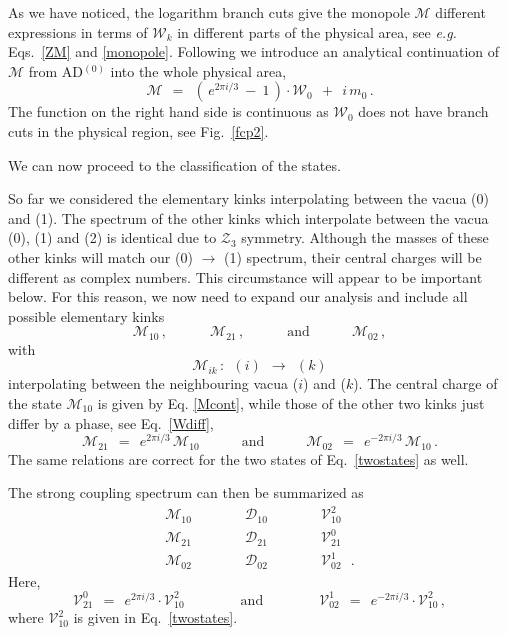 \documentclass[epsfig,12pt]{article}
\def\beq{\begin{equation}}
\def\eeq{\end{equation}}
\def\beq{\begin{equation}}
\def\eeq{\end{equation}}
\newcommand{\mc}[1]{\mathcal{#1}}
\newcommand{\W}{\mathcal{W}}
\newcommand{\M}{\mathcal{M}}
\newcommand{\D}{\mathcal{D}}
\newcommand{\V}{\mathcal{V}}
\begin{document}
	As we have noticed, the logarithm branch cuts give the monopole $ \M $ different expressions in terms
	of $ \W_k $ in different parts of the physical area, see {\it e.g.} Eqs.~\eqref{ZM} and \eqref{monopole}.
	Following \cite{Bolokhov:2011mp} we introduce an analytical continuation of $ \M $ from AD$^{(0)}$ into
	the whole physical area,
\beq
\label{Mcont}
	\M  ~~=~~  \left(\, e^{2 \pi i / 3} ~-~ 1 \,\right) \cdot \W_0  ~~+~~  i\, m_0\,.
\eeq
	The function on the right hand side is continuous as $ \W_0 $ does not have branch cuts in the physical 
	region, see Fig.~\ref{fcp2}.

	We can now proceed to the classification of the states.
	
	So far we considered the elementary kinks interpolating between
	the vacua ({\sc \small 0}) and ({\sc \small 1}).
	The spectrum of the other kinks which interpolate between the vacua ({\sc \small 0}), ({\sc \small 1}) and ({\sc \small 2})
	is identical due to $ \mc{Z}_3 $ symmetry.
	Although the masses of these other kinks will match our ({\sc \small 0}) $ \rightarrow $ ({\sc \small 1}) spectrum, 
	their central charges will be different as complex numbers.
	This circumstance will appear to be important below.
	For this reason, we now need to expand our analysis and include all possible elementary kinks
\beq
	\M_{10}\,,   \qquad\quad     \M_{21}\,,     \qquad\quad\text{and}\qquad\quad   \M_{02}\,,
\eeq
	with
\beq
	\M_{ik} \,:  ~~  ({ \scriptstyle i }) ~~\longrightarrow~~ ({ \scriptstyle k })
\eeq
	interpolating between the neighbouring vacua ($ \scriptstyle i $) and ($ \scriptstyle k $).
	The central charge of the state $ \M_{10} $ is given by Eq. \eqref{Mcont}, while those
	of the other two kinks just differ by a phase, see Eq.~\eqref{Wdiff},
\beq
	\M_{21} ~~=~~ e^{2 \pi i / 3}\, \M_{10}  
	\qquad\quad \text{and} \qquad\quad 
	\M_{02} ~~=~~ e^{- 2 \pi i / 3}\, \M_{10}\,.
\eeq
	The same relations are correct for the two states of Eq.~\eqref{twostates} as well.

	The strong coupling spectrum can then be summarized as
\beq
\label{sspectrum}
	\begin{array}{ccc}
		\M_{10} \qquad\quad    &    \D_{10} \qquad\quad    &    \V_{10}^2    \phantom{~~~.}    \\[2mm]
		\M_{21} \qquad\quad    &    \D_{21} \qquad\quad    &    \V_{21}^0    \phantom{~~~.}    \\[2mm]
		\M_{02} \qquad\quad    &    \D_{02} \qquad\quad    &    \V_{02}^1    ~~~. 
	\end{array}
\eeq
	Here, 
\beq
	\V_{21}^0  ~~=~~  e^{2 \pi i / 3} \cdot \V_{10}^2 
	\qquad\qquad  \text{and}  \qquad\qquad
	\V_{02}^1  ~~=~~  e^{- 2 \pi i / 3} \cdot \V_{10}^2 \,,
\eeq
	where $ \V_{10}^2 $ is given in Eq.~\eqref{twostates}.
\end{document}
